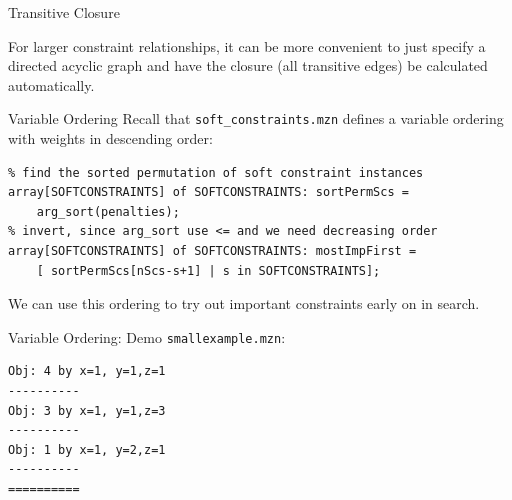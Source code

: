 \documentclass[10pt,xcolor={dvipsnames},fleqn]{beamer}
\begin{document}
\begin{frame}[fragile]{Transitive Closure}
\vspace*{2ex}

For larger constraint relationships, it can be more convenient 
to just specify a directed acyclic graph and have the closure (all transitive edges)
be calculated automatically.

\centering
{}

\end{frame}

\begin{frame}[fragile]{Variable Ordering}
Recall that \texttt{soft\_constraints.mzn} defines a variable ordering with 
weights in descending order:

\vspace*{1ex}

\begin{lstlisting}
% find the sorted permutation of soft constraint instances
array[SOFTCONSTRAINTS] of SOFTCONSTRAINTS: sortPermScs = 
    arg_sort(penalties);
% invert, since arg_sort use <= and we need decreasing order
array[SOFTCONSTRAINTS] of SOFTCONSTRAINTS: mostImpFirst = 
    [ sortPermScs[nScs-s+1] | s in SOFTCONSTRAINTS]; 

\end{lstlisting}

\vspace*{1ex}

We can use this ordering to try out important constraints early on in search.
\end{frame}

\begin{frame}[fragile]{Variable Ordering: Demo}
\texttt{smallexample.mzn}:


\small 
\begin{verbatim}
Obj: 4 by x=1, y=1,z=1
----------
Obj: 3 by x=1, y=1,z=3
----------
Obj: 1 by x=1, y=2,z=1
----------
==========
\end{verbatim}
\end{frame}
\end{document}
